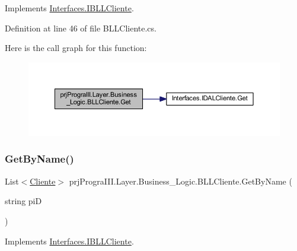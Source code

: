 Implements \hyperlink{interface_interfaces_1_1_i_b_l_l_cliente_abebd310b8b290c0d3f35bfc4dc91c708}{Interfaces.\+I\+B\+L\+L\+Cliente}.



Definition at line 46 of file B\+L\+L\+Cliente.\+cs.

Here is the call graph for this function\+:
\nopagebreak
\begin{figure}[H]
\begin{center}
\leavevmode
\includegraphics[width=350pt]{classprj_progra_i_i_i_1_1_layer_1_1_business___logic_1_1_b_l_l_cliente_abdfaa80f94058237b31fb8599bedd86c_cgraph}
\end{center}
\end{figure}
\hypertarget{classprj_progra_i_i_i_1_1_layer_1_1_business___logic_1_1_b_l_l_cliente_a9963b076dc230773e81b866992a13a14}{}\label{classprj_progra_i_i_i_1_1_layer_1_1_business___logic_1_1_b_l_l_cliente_a9963b076dc230773e81b866992a13a14} 
\subsubsection{\texorpdfstring{Get\+By\+Name()}{GetByName()}}
{\footnotesize\ttfamily List$<$\hyperlink{classprj_progra_i_i_i_1_1_layer_1_1_entities_1_1_cliente}{Cliente}$>$ prj\+Progra\+I\+I\+I.\+Layer.\+Business\+\_\+\+Logic.\+B\+L\+L\+Cliente.\+Get\+By\+Name (\begin{DoxyParamCaption}\item[{string}]{piD }\end{DoxyParamCaption})}



Implements \hyperlink{interface_interfaces_1_1_i_b_l_l_cliente_ad54e0142ff9bd0c63164a4bb102eb854}{Interfaces.\+I\+B\+L\+L\+Cliente}.



